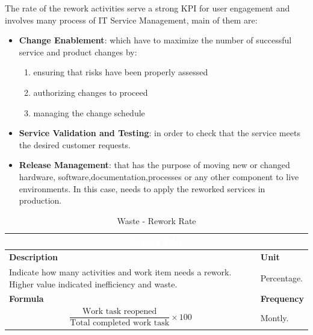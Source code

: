     The rate of the rework activities serve a strong KPI for user engagement and involves many process of IT Service Management, main of them are:
    \begin{itemize}
        \item \textbf{Change Enablement}: which have to maximize the number of successful service and product changes by:
        \begin{enumerate}
            \item ensuring that risks have been properly assessed
            \item authorizing changes to proceed
            \item managing the change schedule
        \end{enumerate}
        \item \textbf{Service Validation and Testing}: in order to check that the service meets the desired customer requests.
        \item \textbf{Release Management}: that has the purpose of moving new or changed hardware, software,documentation,processes or any other component to live environments. In this case, needs to apply the reworked services in production.
    \end{itemize}


        \begin{table}[H]
        \centering
        \renewcommand{\arraystretch}{1.6}
        \setlength{\arrayrulewidth}{0.6pt}

        \begin{tabularx}{\textwidth}{|X|X|}
        \hline
        \multicolumn{2}{|c|}{\cellcolor{mcblue}\textcolor{white}{\textbf{Rework Rate}}} \\ \hline

        \rowcolor{mclightgray}
        \textbf{Description} & \textbf{Unit} \\ \hline
        Indicate how many activities and work item needs a rework. Higher value indicated inefficiency and waste. &
        Percentage. \\ \hline

        \rowcolor{mclightgray}
        \textbf{Formula} & \textbf{Frequency} \\ \hline
        \[
            \frac{\text{Work task reopened}}{\text{Total completed work task}} \times 100
        \]

        &
        Montly. \\ \hline

        \end{tabularx}

        \caption{Waste - Rework Rate}
        \label{tab:measurement_NUMofOpenIncident}
        \end{table}


